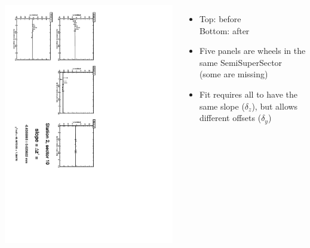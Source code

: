 \documentclass[compress]{beamer}
\begin{document}
\begin{frame}
\begin{columns}
\vfill
\includegraphics[height=\linewidth, angle=90]{zfits_after/zfit_2_10.pdf}
\begin{itemize}
\item Top: before \\ Bottom: after
\item Five panels are wheels in the same SemiSuperSector (some are missing)
\item Fit requires all to have the same slope ($\delta_z$), but allows different offsets ($\delta_y$)
\end{itemize}
\end{columns}
\end{frame}
\end{document}
